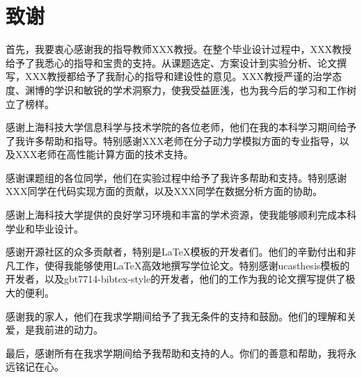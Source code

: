 \chapter[致谢]{致\quad 谢}%
\pagestyle{mainmatterstyle} %

首先，我要衷心感谢我的指导教师XXX教授。在整个毕业设计过程中，XXX教授给予了我悉心的指导和宝贵的支持。从课题选定、方案设计到实验分析、论文撰写，XXX教授都给予了我耐心的指导和建设性的意见。XXX教授严谨的治学态度、渊博的学识和敏锐的学术洞察力，使我受益匪浅，也为我今后的学习和工作树立了榜样。

感谢上海科技大学信息科学与技术学院的各位老师，他们在我的本科学习期间给予了我许多帮助和指导。特别感谢XXX老师在分子动力学模拟方面的专业指导，以及XXX老师在高性能计算方面的技术支持。

感谢课题组的各位同学，他们在实验过程中给予了我许多帮助和支持。特别感谢XXX同学在代码实现方面的贡献，以及XXX同学在数据分析方面的协助。

感谢上海科技大学提供的良好学习环境和丰富的学术资源，使我能够顺利完成本科学业和毕业设计。

感谢开源社区的众多贡献者，特别是LaTeX模板的开发者们。他们的辛勤付出和非凡工作，使得我能够使用LaTeX高效地撰写学位论文。特别感谢ucasthesis模板的开发者，以及gbt7714-bibtex-style的开发者，他们的工作为我的论文撰写提供了极大的便利。

感谢我的家人，他们在我求学期间给予了我无条件的支持和鼓励。他们的理解和关爱，是我前进的动力。

最后，感谢所有在我求学期间给予我帮助和支持的人。你们的善意和帮助，我将永远铭记在心。

\cleardoublepage[plain]%
